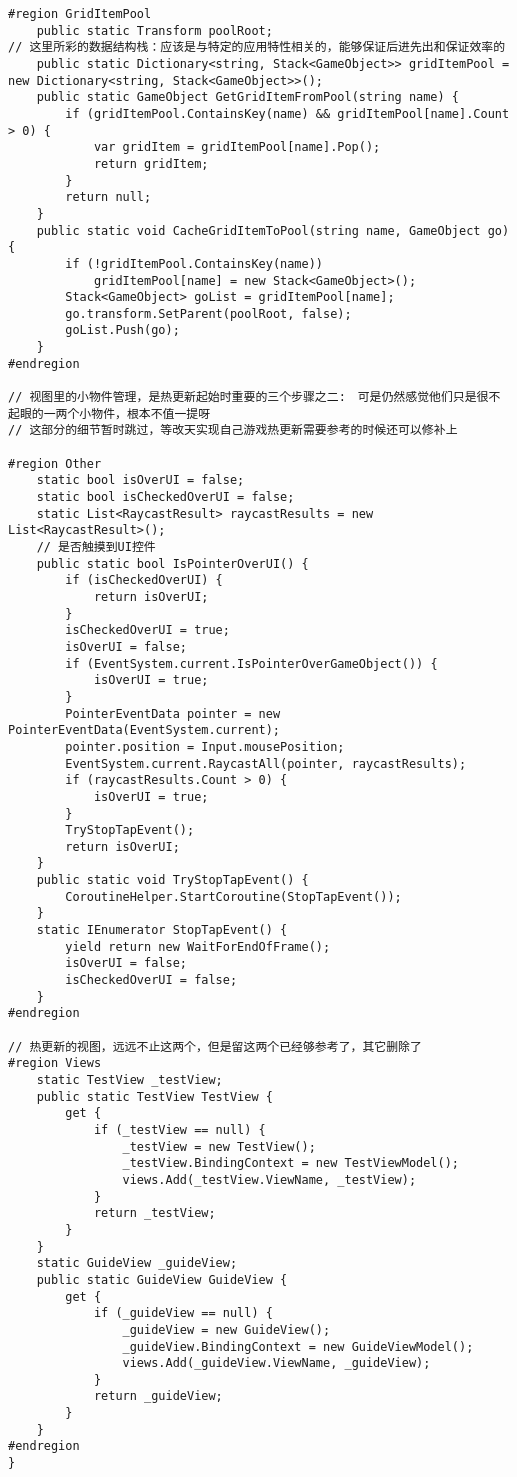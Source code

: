 \documentclass[9pt, b5paper]{article}
\begin{document}
\begin{verbatim}
#region GridItemPool
    public static Transform poolRoot;
// 这里所彩的数据结构栈：应该是与特定的应用特性相关的，能够保证后进先出和保证效率的
    public static Dictionary<string, Stack<GameObject>> gridItemPool = new Dictionary<string, Stack<GameObject>>();
    public static GameObject GetGridItemFromPool(string name) {
        if (gridItemPool.ContainsKey(name) && gridItemPool[name].Count > 0) {
            var gridItem = gridItemPool[name].Pop();
            return gridItem;
        }
        return null;
    }
    public static void CacheGridItemToPool(string name, GameObject go) {
        if (!gridItemPool.ContainsKey(name)) 
            gridItemPool[name] = new Stack<GameObject>();
        Stack<GameObject> goList = gridItemPool[name];
        go.transform.SetParent(poolRoot, false);
        goList.Push(go);
    }
#endregion
    
// 视图里的小物件管理，是热更新起始时重要的三个步骤之二:　可是仍然感觉他们只是很不起眼的一两个小物件，根本不值一提呀
// 这部分的细节暂时跳过，等改天实现自己游戏热更新需要参考的时候还可以修补上    

#region Other
    static bool isOverUI = false;
    static bool isCheckedOverUI = false;
    static List<RaycastResult> raycastResults = new List<RaycastResult>();
    // 是否触摸到UI控件
    public static bool IsPointerOverUI() {
        if (isCheckedOverUI) {
            return isOverUI;
        }
        isCheckedOverUI = true;
        isOverUI = false;
        if (EventSystem.current.IsPointerOverGameObject()) {
            isOverUI = true;
        }
        PointerEventData pointer = new PointerEventData(EventSystem.current);
        pointer.position = Input.mousePosition;
        EventSystem.current.RaycastAll(pointer, raycastResults);
        if (raycastResults.Count > 0) {
            isOverUI = true;
        }
        TryStopTapEvent();
        return isOverUI;
    }
    public static void TryStopTapEvent() {
        CoroutineHelper.StartCoroutine(StopTapEvent());
    }
    static IEnumerator StopTapEvent() {
        yield return new WaitForEndOfFrame();
        isOverUI = false;
        isCheckedOverUI = false;
    }
#endregion

// 热更新的视图，远远不止这两个，但是留这两个已经够参考了，其它删除了
#region Views
    static TestView _testView;
    public static TestView TestView {
        get {
            if (_testView == null) {
                _testView = new TestView();
                _testView.BindingContext = new TestViewModel();
                views.Add(_testView.ViewName, _testView);
            }
            return _testView;
        }
    }
    static GuideView _guideView;
    public static GuideView GuideView {
        get {
            if (_guideView == null) {
                _guideView = new GuideView();
                _guideView.BindingContext = new GuideViewModel();
                views.Add(_guideView.ViewName, _guideView);
            }
            return _guideView;
        }
    }
#endregion
}
\end{verbatim}
\end{document}

